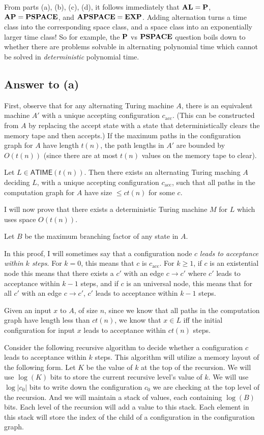 \documentclass{article}
\def \ATIME{{\mathsf{ATIME}}}
\begin{document}
From parts (a), (b), (c), (d), it follows immediately that $\bf{AL}=\bf{P}$, $\bf{AP}=\bf{PSPACE}$, and $\bf{APSPACE}=\bf{EXP}$. Adding alternation turns a time class into the corresponding space class, and a space class into an exponentially larger time class! So for example, the $\bf{P}$ vs $\bf{PSPACE}$ question boils down to whether there are problems solvable in alternating polynomial time which cannot be solved in \emph{deterministic} polynomial time. 

\subsection*{Answer to (a)}
First, observe that for any alternating Turing machine $A$, there is an equivalent machine $A'$ with a unique accepting configuration $c_\text{acc}$.  (This can be constructed from $A$ by replacing the accept state with a state that deterministically clears the memory tape and then accepts.)  If the maximum paths in the configuration graph for $A$ have length $t(n)$, the path lengths in $A'$ are bounded by $O(t(n))$ (since there are at most $t(n)$ values on the memory tape to clear).

Let $L \in \ATIME(t(n))$.  Then there exists an alternating Turing maching $A$ deciding $L$, with a unique accepting configuration $c_\text{acc}$, such that all paths in the computation graph for $A$ have size $\leq c t(n)$ for some $c$.

I will now prove that there exists a deterministic Turing machine $M$ for $L$ which uses space $O(t(n))$.

Let $B$ be the maximum branching factor of any state in $A$.

In this proof, I will sometimes say that a configuration node $c$ \textit{leads to acceptance within $k$ steps}.  For $k = 0$, this means that $c$ is $c_\text{acc}$.  For $k \geq 1$, if $c$ is an existential node this means that there exists a $c'$ with an edge $c \to c'$ where $c'$ leads to acceptance within $k - 1$ steps, and if $c$ is an universal node, this means that for all $c'$ with an edge $c \to c'$, $c'$ leads to acceptance within $k - 1$ steps.

Given an input $x$ to $A$, of size $n$, since we know that all paths in the computation graph have length less than $c t(n)$, we know that $x \in L$ iff the initial configuration for input $x$ leads to acceptance within $c t(n)$ steps.

Consider the following recursive algorithm to decide whether a configuration $c$ leads to acceptance within $k$ steps.  This algorithm will utilize a memory layout of the following form.  Let $K$ be the value of $k$ at the top of the recursion.  We will use $\log(K)$ bits to store the current recursive level's value of $k$.  We will use $\log |c_0|$ bits to write down the configuration $c_0$ we are checking at the top level of the recursion.  And we will maintain a stack of values, each containing $\log(B)$ bits.  Each level of the recursion will add a value to this stack.  Each element in this stack will store the index of the child of a configuration in the configuration graph.
\end{document}
